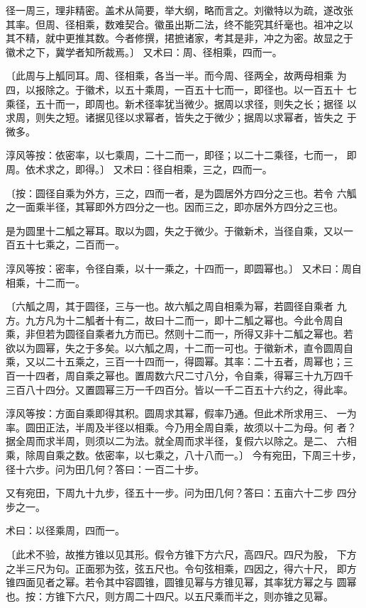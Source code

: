 \documentclass[a4paper,12pt,UTF8,twoside]{ctexbook}
\begin{document}
径一周三，理非精密。盖术从简要，举大纲，略而言之。刘徽特以为疏，遂改张 其率。但周、径相乘，数难契合。徽虽出斯二法，终不能究其纤毫也。祖冲之以 其不精，就中更推其数。今者修撰，捃摭诸家，考其是非，冲之为密。故显之于 徽术之下，冀学者知所裁焉。〕 又术曰：周、径相乘，四而一。

〔此周与上觚同耳。周、径相乘，各当一半。而今周、径两全，故两母相乘 为四，以报除之。于徽术，以五十乘周，一百五十七而一，即径也。以一百五十 七乘径，五十而一，即周也。新术径率犹当微少。据周以求径，则失之长；据径 以求周，则失之短。诸据见径以求幂者，皆失之于微少；据周以求幂者，皆失之 于微多。

淳风等按：依密率，以七乘周，二十二而一，即径；以二十二乘径，七而一， 即周。依术求之，即得。〕 又术曰：径自相乘，三之，四而一。

〔按：圆径自乘为外方，三之，四而一者，是为圆居外方四分之三也。若令 六觚之一面乘半径，其幂即外方四分之一也。因而三之，即亦居外方四分之三也。

是为圆里十二觚之幂耳。取以为圆，失之于微少。于徽新术，当径自乘，又以一 百五十七乘之，二百而一。

淳风等按：密率，令径自乘，以十一乘之，十四而一，即圆幂也。〕 又术曰：周自相乘，十二而一。

〔六觚之周，其于圆径，三与一也。故六觚之周自相乘为幂，若圆径自乘者 九方。九方凡为十二觚者十有二，故曰十二而一，即十二觚之幂也。今此令周自 乘，非但若为圆径自乘者九方而已。然则十二而一，所得又非十二觚之幂也。若 欲以为圆幂，失之于多矣。以六觚之周，十二而一可也。于徽新术，直令圆周自 乘，又以二十五乘之，三百一十四而一，得圆幂。其率：二十五者，周幂也；三 百一十四者，周自乘之幂也。置周数六尺二寸八分，令自乘，得幂三十九万四千 三百八十四分。又置圆幂三万一千四百分。皆以一千二百五十六约之，得此率。

淳风等按：方面自乘即得其积。圆周求其幂，假率乃通。但此术所求用三、 一为率。圆田正法，半周及半径以相乘。今乃用全周自乘，故须以十二为母。何 者？据全周而求半周，则须以二为法。就全周而求半径，复假六以除之。是二、 六相乘，除周自乘之数。依密率，以七乘之，八十八而一。〕 今有宛田，下周三十步，径十六步。问为田几何？答曰：一百二十步。

又有宛田，下周九十九步，径五十一步。问为田几何？答曰：五亩六十二步 四分步之一。

术曰：以径乘周，四而一。

〔此术不验，故推方锥以见其形。假令方锥下方六尺，高四尺。四尺为股， 下方之半三尺为句。正面邪为弦，弦五尺也。令句弦相乘，四因之，得六十尺， 即方锥四面见者之幂。若令其中容圆锥，圆锥见幂与方锥见幂，其率犹方幂之与 圆幂也。按：方锥下六尺，则方周二十四尺。以五尺乘而半之，则亦锥之见幂。
\end{document}
